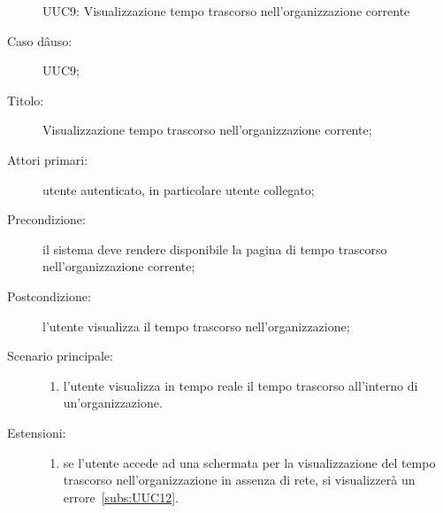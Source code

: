 \documentclass[../../../analisi-dei-requisiti.tex]{subfiles}
\begin{document}
\begin{figure}[H]
  \centering
  \caption{UUC9: Visualizzazione tempo trascorso nell'organizzazione corrente}%
  \label{fig:UUC9}
\end{figure}

\begin{description}
  \item[Caso dâuso:] UUC9;
  \item[Titolo:] Visualizzazione tempo trascorso nell'organizzazione corrente;
  \item[Attori primari:] utente autenticato, in particolare utente collegato;
  \item[Precondizione:] il sistema deve rendere disponibile la pagina di tempo trascorso nell'organizzazione corrente;
  \item[Postcondizione:] l'utente visualizza il tempo trascorso nell'organizzazione;
  \item[Scenario principale:]
        \begin{enumerate}
          \item l'utente visualizza in tempo reale il tempo trascorso all'interno di un'organizzazione.
        \end{enumerate}
  \item[Estensioni:]
        \begin{enumerate}
          \item se l'utente accede ad una schermata per la visualizzazione del tempo trascorso nell'organizzazione in assenza di rete, si visualizzerà un errore~\ref{subs:UUC12}.
        \end{enumerate}
\end{description}
\end{document}
